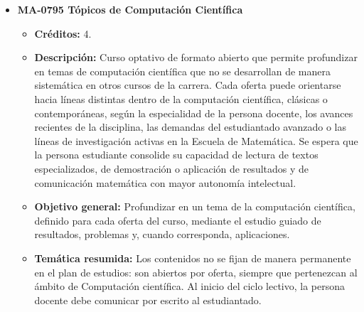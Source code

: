 \begin{itemize}[leftmargin=1.3em, itemsep=10pt, topsep=4pt, label={\color{Azul-UCR}$\blacksquare$}]
\item {\color{Azul-UCR}\textbf{MA-0795 Tópicos de Computación Científica}}\par\nopagebreak\smallskip
\begin{itemize}[leftmargin=1.1em, itemsep=3pt, topsep=2pt, parsep=2pt, label={\textendash}]
\item \textbf{Créditos:} 4.
\item \textbf{Descripción:} Curso optativo de formato abierto que permite profundizar en temas de computación científica que no se desarrollan de manera sistemática en otros cursos de la carrera. Cada oferta puede orientarse hacia líneas distintas dentro de la computación científica, clásicas o contemporáneas, según la especialidad de la persona docente, los avances recientes de la disciplina, las demandas del estudiantado avanzado o las líneas de investigación activas en la Escuela de Matemática. Se espera que la persona estudiante consolide su capacidad de lectura de textos especializados, de demostración o aplicación de resultados y de comunicación matemática con mayor autonomía intelectual.
\item \textbf{Objetivo general:} Profundizar en un tema de la computación científica, definido para cada oferta del curso, mediante el estudio guiado de resultados, problemas y, cuando corresponda, aplicaciones.
\item \textbf{Temática resumida:} Los contenidos no se fijan de manera permanente en el plan de estudios: son abiertos por oferta, siempre que pertenezcan al ámbito de Computación científica. Al inicio del ciclo lectivo, la persona docente debe comunicar por escrito al estudiantado.
\end{itemize}


\end{itemize}
